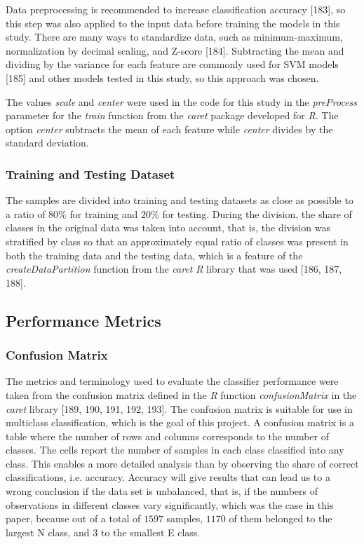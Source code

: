 \documentclass[sn-mathphys-num]{sn-jnl}%
\begin{document}
Data preprocessing is recommended to increase classification accuracy [183], so this step was also applied to the input data before training the models in this study. There are many ways to standardize data, such as minimum-maximum, normalization by decimal scaling, and Z-score [184]. Subtracting the mean and dividing by the variance for each feature are commonly used for SVM models [185] and other models tested in this study, so this approach was chosen. 

The values \textit{scale} and \textit{center} were used in the code for this study in the \textit{preProcess} parameter for the \textit{train} function from the \textit{caret} package developed for \textit{R}. The option \textit{center} subtracts the mean of each feature while \textit{center} divides by the standard deviation. 

\subsubsection{Training and Testing Dataset}

The samples are divided into training and testing datasets as close as possible to a ratio of $80\%$ for training and $20\%$ for testing. During the division, the share of classes in the original data was taken into account, that is, the division was stratified by class so that an approximately equal ratio of classes was present in both the training data and the testing data, which is a feature of the \textit{createDataPartition} function from the \textit{caret} \textit{R} library that was used [186, 187, 188].

\subsection{Performance Metrics}

\subsubsection{Confusion Matrix}

The metrics and terminology used to evaluate the classifier performance were taken from the confusion matrix defined in the \textit{R} function \textit{confusionMatrix} in the \textit{caret} library [189, 190, 191, 192, 193]. The confusion matrix is suitable for use in multiclass classification, which is the goal of this project. A confusion matrix is a table where the number of rows and columns corresponds to the number of classes. The cells report the number of samples in each class classified into any class. This enables a more detailed analysis than by observing the share of correct classifications, i.e. accuracy. Accuracy will give results that can lead us to a wrong conclusion if the data set is unbalanced, that is, if the numbers of observations in different classes vary significantly, which was the case in this paper, because out of a total of $1597$ samples, $1170$ of them belonged to the largest N class, and $3$ to the smallest E class.
\end{document}
